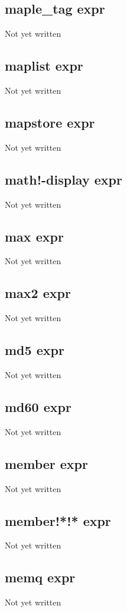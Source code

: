 \documentclass[a4paper,11pt]{article}
\begin{document}
\subsection{\ttfamily maple\_tag expr}
Not yet written

\subsection{\ttfamily maplist expr}
Not yet written

\subsection{\ttfamily mapstore expr}
Not yet written

\subsection{\ttfamily math!-display expr}
Not yet written

\subsection{\ttfamily max expr}
Not yet written

\subsection{\ttfamily max2 expr}
Not yet written

\subsection{\ttfamily md5 expr}
Not yet written

\subsection{\ttfamily md60 expr}
Not yet written

\subsection{\ttfamily member expr}
Not yet written

\subsection{\ttfamily member!*!* expr}
Not yet written

\subsection{\ttfamily memq expr}
Not yet written
\end{document}
